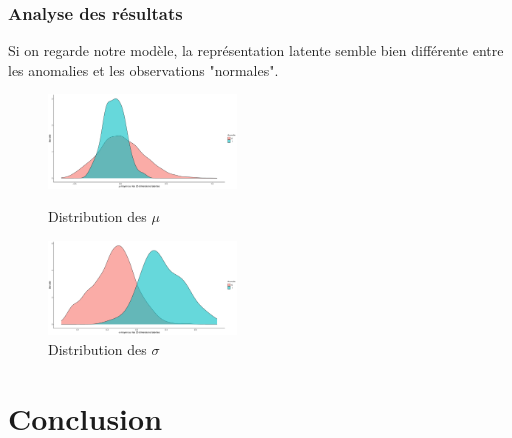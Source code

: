 \documentclass{beamer}
\begin{document}
	\begin{frame}
		\frametitle{Analyse des résultats}
		
		Si on regarde notre modèle, la représentation latente semble bien différente entre les anomalies et les observations "normales".
		
		\vspace{0.5cm}
		
		\begin{figure}
			\centering
			\begin{minipage}{.45\textwidth}
				\includegraphics[width=5cm]{../rapports/images/latent_stats/plot_mu}
				\caption{Distribution des $\mu$}
			\end{minipage}\hfill
			\begin{minipage}{.45\textwidth}
				\includegraphics[width=5cm]{../rapports/images/latent_stats/plot_sigma}
				\caption{Distribution des $\sigma$}
			\end{minipage}
		\end{figure}
		
	\end{frame}
	
	\section{Conclusion}
	
\end{document}
